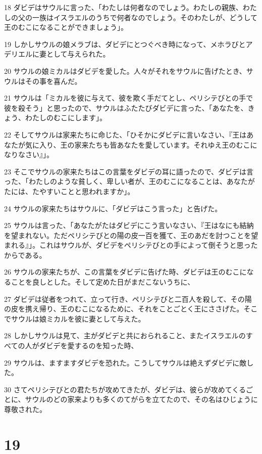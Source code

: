 \par 18 ダビデはサウルに言った、「わたしは何者なのでしょう。わたしの親族、わたしの父の一族はイスラエルのうちで何者なのでしょう。そのわたしが、どうして王のむこになることができましょう」。
\par 19 しかしサウルの娘メラブは、ダビデにとつぐべき時になって、メホラびとアデリエルに妻として与えられた。
\par 20 サウルの娘ミカルはダビデを愛した。人々がそれをサウルに告げたとき、サウルはその事を喜んだ。
\par 21 サウルは「ミカルを彼に与えて、彼を欺く手だてとし、ペリシテびとの手で彼を殺そう」と思ったので、サウルはふたたびダビデに言った、「あなたを、きょう、わたしのむこにします」。
\par 22 そしてサウルは家来たちに命じた、「ひそかにダビデに言いなさい、『王はあなたが気に入り、王の家来たちも皆あなたを愛しています。それゆえ王のむこになりなさい』」。
\par 23 そこでサウルの家来たちはこの言葉をダビデの耳に語ったので、ダビデは言った、「わたしのような貧しく、卑しい者が、王のむこになることは、あなたがたには、たやすいことと思われますか」。
\par 24 サウルの家来たちはサウルに、「ダビデはこう言った」と告げた。
\par 25 サウルは言った、「あなたがたはダビデにこう言いなさい、『王はなにも結納を望まれない。ただペリシテびとの陽の皮一百を獲て、王のあだを討つことを望まれる』」。これはサウルが、ダビデをペリシテびとの手によって倒そうと思ったからである。
\par 26 サウルの家来たちが、この言葉をダビデに告げた時、ダビデは王のむこになることを良しとした。そして定めた日がまだこないうちに、
\par 27 ダビデは従者をつれて、立って行き、ペリシテびと二百人を殺して、その陽の皮を携え帰り、王のむこになるために、それをことごとく王にささげた。そこでサウルは娘ミカルを彼に妻として与えた。
\par 28 しかしサウルは見て、主がダビデと共におられること、またイスラエルのすべての人がダビデを愛するのを知った時、
\par 29 サウルは、ますますダビデを恐れた。こうしてサウルは絶えずダビデに敵した。
\par 30 さてペリシテびとの君たちが攻めてきたが、ダビデは、彼らが攻めてくるごとに、サウルのどの家来よりも多くのてがらを立てたので、その名はひじょうに尊敬された。

\chapter{19}

